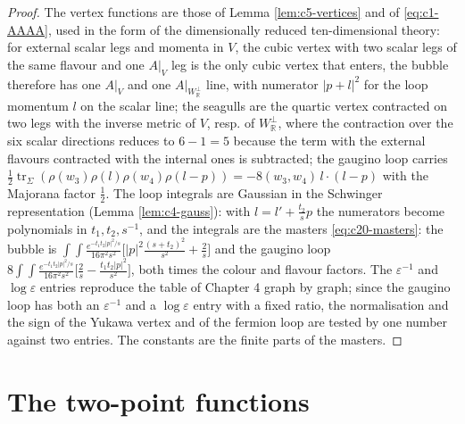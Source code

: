 \begin{proof}
The vertex functions are those of Lemma \ref{lem:c5-vertices} and of \eqref{eq:c1-AAAA}, used in the form of the dimensionally reduced ten-dimensional theory: for external scalar legs and momenta in $V$, the cubic vertex with two scalar legs of the same flavour and one $A|_V$ leg is the only cubic vertex that enters, the bubble therefore has one $A|_V$ and one $A|_{W_{\mathbb R}^\perp}$ line, with numerator $|p+l|^2$ for the loop momentum $l$ on the scalar line; the seagulls are the quartic vertex contracted on two legs with the inverse metric of $V$, resp. of $W_{\mathbb R}^\perp$, where the contraction over the six scalar directions reduces to $6-1=5$ because the term with the external flavours contracted with the internal ones is subtracted; the gaugino loop carries $\tfrac12\operatorname{tr}_\Sigma(\rho(w_3)\rho(l)\rho(w_4)\rho(l-p))=-8(w_3,w_4)\,l\cdot(l-p)$ with the Majorana factor $\tfrac12$. The loop integrals are Gaussian in the Schwinger representation (Lemma \ref{lem:c4-gauss}): with $l=l'+\tfrac{t_2}sp$ the numerators become polynomials in $t_1,t_2,s^{-1}$, and the integrals are the masters \eqref{eq:c20-masters}: the bubble is $\int\!\!\int\frac{e^{-t_1t_2|p|^2/s}}{16\pi^2s^2}\big[|p|^2\tfrac{(s+t_2)^2}{s^2}+\tfrac2s\big]$ and the gaugino loop $8\int\!\!\int\frac{e^{-t_1t_2|p|^2/s}}{16\pi^2s^2}\big[\tfrac2s-\tfrac{t_1t_2|p|^2}{s^2}\big]$, both times the colour and flavour factors. The $\varepsilon^{-1}$ and $\log\varepsilon$ entries reproduce the table of Chapter 4 graph by graph; since the gaugino loop has both an $\varepsilon^{-1}$ and a $\log\varepsilon$ entry with a fixed ratio, the normalisation and the sign of the Yukawa vertex and of the fermion loop are tested by one number against two entries. The constants are the finite parts of the masters.
\end{proof}

\section{The two-point functions}


